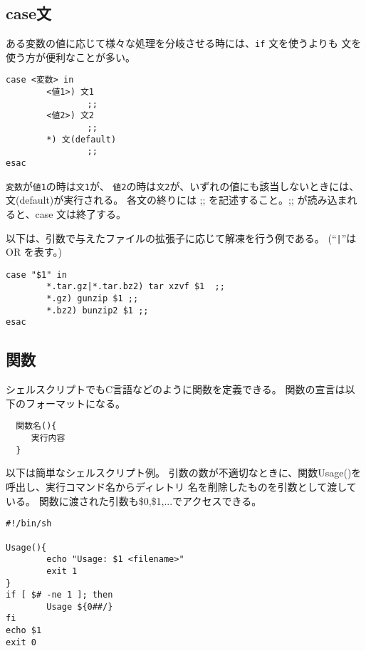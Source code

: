 \documentclass{jreport}
\begin{document}
\subsection{case文}

ある変数の値に応じて様々な処理を分岐させる時には、\verb|if| 文を使うよりも
 文を使う方が便利なことが多い。
\begin{screen}
\begin{verbatim}
case <変数> in 
        <値1>) 文1
                ;;
        <値2>) 文2
                ;;
        *) 文(default)
                ;;
esac
\end{verbatim}
\end{screen}
\verb|変数|が\verb|値1|の時は\verb|文1|が、
\verb|値2|の時は\verb|文2|が、いずれの値にも該当しないときには、
文(default)が実行される。
各文の終りには ;; を記述すること。;; が読み込まれると、case 文は終了する。

以下は、引数で与えたファイルの拡張子に応じて解凍を行う例である。
(``\verb+|+''は OR を表す。)
\begin{screen}
\begin{verbatim}
case "$1" in 
        *.tar.gz|*.tar.bz2) tar xzvf $1  ;;
        *.gz) gunzip $1 ;;
        *.bz2) bunzip2 $1 ;;
esac
\end{verbatim}
\end{screen}

\subsection{関数}

シェルスクリプトでもC言語などのように関数を定義できる。
関数の宣言は以下のフォーマットになる。
\begin{screen}
\begin{verbatim}
  関数名(){
     実行内容
  }
\end{verbatim}
\end{screen}
以下は簡単なシェルスクリプト例。
引数の数が不適切なときに、関数Usage()を呼出し、実行コマンド名からディレトリ
名を削除したものを引数として渡している。
関数に渡された引数も\$0,\$1,...でアクセスできる。
\begin{screen}
\begin{verbatim}
#!/bin/sh

Usage(){
        echo "Usage: $1 <filename>"
        exit 1
}
if [ $# -ne 1 ]; then
        Usage ${0##/}
fi
echo $1
exit 0
\end{verbatim}
\end{screen}
\end{document}
